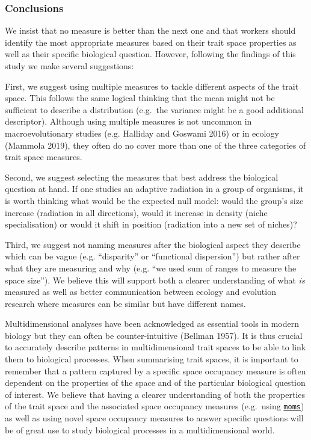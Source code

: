 \documentclass[]{article}
\begin{document}
\subsubsection{Conclusions}\label{conclusions}

We insist that no measure is better than the next one and that workers
should identify the most appropriate measures based on their trait space
properties as well as their specific biological question. However,
following the findings of this study we make several suggestions:

First, we suggest using multiple measures to tackle different aspects of
the trait space. This follows the same logical thinking that the mean
might not be sufficient to describe a distribution (e.g.~the variance
might be a good additional descriptor). Although using multiple measures
is not uncommon in macroevolutionary studies (e.g. Halliday and Goswami
2016) or in ecology (Mammola 2019), they often do no cover more than one
of the three categories of trait space measures.

Second, we suggest selecting the measures that best address the
biological question at hand. If one studies an adaptive radiation in a
group of organisms, it is worth thinking what would be the expected null
model: would the group's size increase (radiation in all directions),
would it increase in density (niche specialisation) or would it shift in
position (radiation into a new set of niches)?

Third, we suggest not naming measures after the biological aspect they
describe which can be vague (e.g. ``disparity'' or ``functional
dispersion'') but rather after what they are measuring and why (e.g.
``we used sum of ranges to measure the space size''). We believe this
will support both a clearer understanding of what \emph{is} measured as
well as better communication between ecology and evolution research
where measures can be similar but have different names.

Multidimensional analyses have been acknowledged as essential tools in
modern biology but they can often be counter-intuitive (Bellman 1957).
It is thus crucial to accurately describe patterns in multidimensional
trait spaces to be able to link them to biological processes. When
summarising trait spaces, it is important to remember that a pattern
captured by a specific space occupancy measure is often dependent on the
properties of the space and of the particular biological question of
interest. We believe that having a clearer understanding of both the
properties of the trait space and the associated space occupancy
measures (e.g.~using
\href{https://tguillerme.shinyapps.io/moms/}{\texttt{moms}}) as well as
using novel space occupancy measures to answer specific questions will
be of great use to study biological processes in a multidimensional
world.
\end{document}
